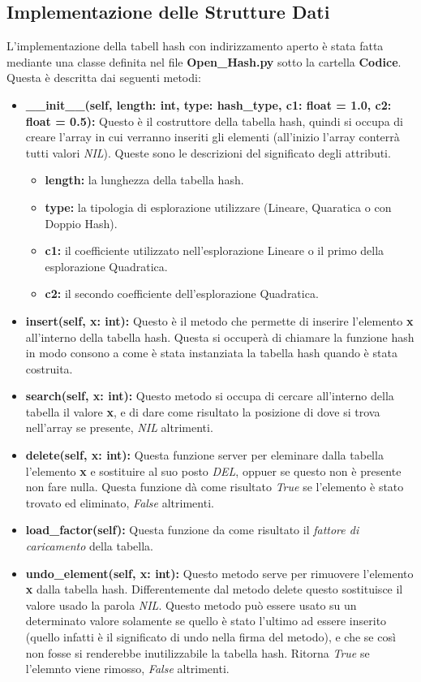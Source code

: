 \documentclass{article}
\newcommand{\newlineitem}[1]{\item \textbf{#1} \hfill \break}
\begin{document}
\subsection{Implementazione delle Strutture Dati}
L'implementazione della tabell hash con indirizzamento aperto è stata fatta mediante una classe definita nel file \textbf{Open\_Hash.py} sotto la cartella \textbf{Codice}. Questa è descritta dai seguenti metodi:
\begin{itemize}
\item \textbf{\_\_init\_\_(self, length: int, type: hash\_type, c1: float = 1.0, c2: float = 0.5):}\break \hfill
Questo è il costruttore della tabella hash, quindi si occupa di creare l'array in cui verranno inseriti gli elementi (all'inizio l'array conterrà tutti valori \emph{NIL}). Queste sono le descrizioni del significato degli attributi.
\begin{itemize}
\item \textbf{length: } la lunghezza della tabella hash.
\item \textbf{type: } la tipologia di  esplorazione utilizzare (Lineare, Quaratica o con Doppio Hash).
\item \textbf{c1: } il coefficiente utilizzato nell'esplorazione Lineare o il primo della esplorazione Quadratica.
\item \textbf{c2: } il secondo coefficiente dell'esplorazione Quadratica.
\end{itemize}
\newlineitem{insert(self, x: int):}
Questo è il metodo che permette di inserire l'elemento \textbf{x} all'interno della tabella hash. Questa si occuperà di chiamare la funzione hash in modo consono a come è stata instanziata la tabella hash quando è stata costruita.
\newlineitem{search(self, x: int):}
Questo metodo si occupa di cercare all'interno della tabella il valore \textbf{x}, e di dare come risultato la posizione di dove si trova nell'array se presente, \emph{NIL} altrimenti.
\newlineitem{delete(self, x: int):}
Questa funzione server per eleminare dalla tabella l'elemento \textbf{x} e sostituire al suo posto \emph{DEL}, oppuer se questo non è presente non fare nulla. Questa funzione dà come risultato \emph{True} se l'elemento è stato trovato ed eliminato, \emph{False} altrimenti.
\newlineitem{load\_factor(self):}
Questa funzione da come risultato il \emph{fattore di caricamento} della tabella.

\newlineitem{undo\_element(self, x: int):}
Questo metodo serve per rimuovere l'elemento \textbf{x} dalla tabella hash. Differentemente dal metodo delete questo sostituisce il valore usado la parola \emph{NIL}. Questo metodo può essere usato su un determinato valore solamente se quello è stato l'ultimo ad essere inserito (quello infatti è il significato di undo nella firma del metodo), e che se così non fosse si renderebbe inutilizzabile la tabella hash. Ritorna \emph{True} se l'elemnto viene rimosso, \emph{False} altrimenti.


\end{itemize}
\end{document}

